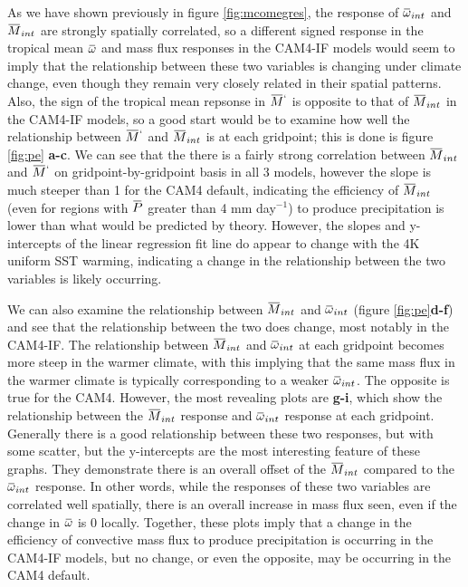 \documentclass[letterpaper,12pt,titlepage,oneside,final]{book}
\newcommand{\overbar}[1]{\mkern 1.5mu\overline{\mkern-1.5mu#1\mkern-1.5mu}\mkern 1.5mu}
\begin{document}
As we have shown previously in figure \ref{fig:mcomegres}, the response of $\overbar{\omega}_{int}$ and $\overbar{M}_{int}$ are strongly spatially correlated, so a different signed response in the tropical mean $\overbar{\omega}$ and mass flux responses in the CAM4-IF models would seem to imply that the relationship between these two variables is changing under climate change, even though they remain very closely related in their spatial patterns. Also, the sign of the tropical mean repsonse in $\overbar{M}^{`}$ is opposite to that of $\overbar{M}_{int}$ in the CAM4-IF models, so a good start would be to examine how well the relationship between $\overbar{M}^{`}$ and $\overbar{M}_{int}$ is at each gridpoint; this is done is figure \ref{fig:pe} \textbf{a-c}. We can see that the there is a fairly strong correlation between $\overbar{M}_{int}$ and $\overbar{M}^{`}$  on gridpoint-by-gridpoint basis in all 3 models, however the slope is much steeper than 1 for the CAM4 default, indicating the efficiency of $\overbar{M}_{int}$ (even for regions with $\overbar{P}$ greater than 4 mm day$^{-1}$) to produce precipitation is lower than what would be predicted by theory. However, the slopes and y-intercepts of the linear regression fit line do appear to change with the 4K uniform SST warming, indicating a change in the relationship between the two variables is likely occurring. 

We can also examine the relationship between $\overbar{M}_{int}$ and $\overbar{\omega}_{int}$ (figure \ref{fig:pe}\textbf{d-f}) and see that the relationship between the two does change, most notably in the CAM4-IF. The relationship between $\overbar{M}_{int}$ and $\overbar{\omega}_{int}$  at each gridpoint becomes more steep in the warmer climate, with this implying that the same mass flux in the warmer climate is typically corresponding to a weaker $\overbar{\omega}_{int}$. The opposite is true for the CAM4. However, the most revealing plots are \textbf{g-i}, which show the relationship between the $\overbar{M}_{int}$ response and $\overbar{\omega}_{int}$ response at each gridpoint. Generally there is a good relationship between these two responses, but with some scatter, but the y-intercepts are the most interesting feature of these graphs. They demonstrate there is an overall offset of the $\overbar{M}_{int}$ compared to the $\overbar{\omega}_{int}$ response. In other words, while the responses of these two variables are correlated well spatially, there is an overall increase in mass flux seen, even if the change in $\overbar{\omega}$ is 0 locally. Together, these plots imply that a change in the efficiency of convective mass flux to produce precipitation is occurring in the CAM4-IF models, but no change, or even the opposite, may be occurring in the CAM4 default.
\end{document}
